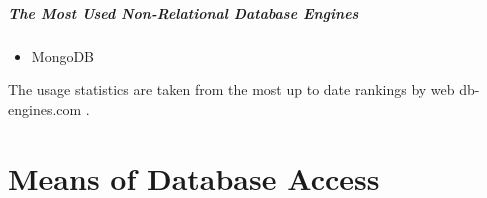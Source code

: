 \subparagraph{The Most Used Non-Relational Database Engines} 
\begin{itemize}
	\item MongoDB
\end{itemize}


The usage statistics are taken from the most up to date rankings by web db-engines.com \cite{DatabaseEnginesStatistics19}.

\section{Means of Database Access}
